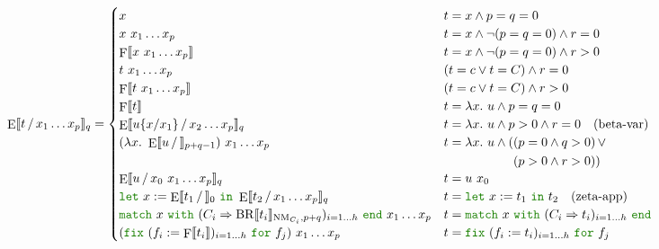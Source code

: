 \documentclass[a4paper,fleqn]{article}
\newcommand{\kwlet}{\mbox{\color{mygreen}\ttfamily let}}
\newcommand{\kwin}{\mbox{\color{mygreen}\ttfamily in}}
\newcommand{\kwmatch}{\mbox{\color{mygreen}\ttfamily match}}
\newcommand{\kwwith}{\mbox{\color{mygreen}\ttfamily with}}
\newcommand{\kwend}{\mbox{\color{mygreen}\ttfamily end}}
\newcommand{\kwfix}{\mbox{\color{mygreen}\ttfamily fix}}
\newcommand{\kwfor}{\mbox{\color{mygreen}\ttfamily for}}
\newcommand{\lam}[2]{\lambda #1.~#2}
\newcommand{\letin}[3]{\kwlet~#1:=#2~\kwin~#3}
\newcommand{\match}[4]{\kwmatch~#1~\kwwith~(#2 \Rightarrow #3)_{#4}~\kwend}
\newcommand{\fix}[4]{\kwfix~(#1 := #2)_{#3}~\kwfor~#4}
\DeclareMathOperator{\NM}{NM}
\newcommand{\BRA}[1]{\llbracket #1 \rrbracket}
\DeclareMathOperator{\Fop}{F}
\newcommand{\F}[1]{\Fop\BRA{#1}}
\DeclareMathOperator{\BRop}{BR}
\newcommand{\BR}[3]{\BRop\BRA{#1}_{#2,#3}}
\DeclareMathOperator{\Eop}{E}
\newcommand{\E}[3]{\Eop\BRA{#1\,/\,#2}_{#3}}
\newcommand{\subst}[3]{#1\{#2/#3\}}
\begin{document}
\[
  \E{t}{x_1\dots x_p}{q} =
  \begin{cases}
    x                                                                                                 & t = x \wedge p = q = 0 \\
    x~x_1\dots x_p                                                                                    & t = x \wedge \neg (p = q = 0) \wedge r = 0 \\
    \F{x~x_1\dots x_p}                                                                                 & t = x \wedge \neg (p = q = 0) \wedge r > 0 \\
    t~x_1\dots x_p                                                                                    & (t = c \vee t = C) \wedge r = 0 \\
    \F{t~x_1\dots x_p}                                                                                 & (t = c \vee t = C) \wedge r > 0 \\
    \F{t}                                                                                              & t = \lam{x}{u} \wedge p = q = 0 \\
    \E{\subst{u}{x}{x_1}}{x_2\dots x_p}{q}                                                             & t = \lam{x}{u} \wedge p > 0 \wedge r = 0 \quad \text{(beta-var)} \\
    (\lam{x}{\E{u}{}{p+q-1}})~x_1\dots x_p                                                             & t = \lam{x}{u} \wedge (\begin{aligned}[t]
                                                                                                                                & (p = 0 \wedge q > 0) \mathop{\vee} \\
                                                                                                                                & (p > 0 \wedge r > 0))
                                                                                                                                \end{aligned} \\
    \E{u}{x_0~x_1\dots x_p}{q}                                                                & t = u~x_0 \\
    \letin{x}{\E{t_1}{}{0}}{\E{t_2}{x_1\dots x_p}{q}}                                                            & t = \letin{x}{t_1}{t_2} \quad \text{(zeta-app)} \\
    \match{x}{C_i}{\BR{t_i}{\NM_{C_i}}{p+q}}{i=1\dots h}~x_1\dots x_p                                   & t = \match{x}{C_i}{t_i}{i=1\dots h} \\
    (\fix{f_i}{\F{t_i}}{i=1\dots h}{f_j})~x_1\dots x_p                                             & t = \fix{f_i}{t_i}{i=1\dots h}{f_j}
  \end{cases}
\]
\end{document}

